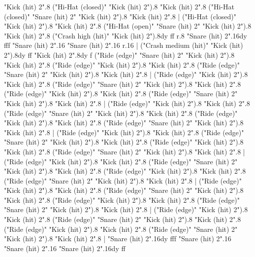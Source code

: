       "Kick (hit) 2".8
      ("Hi-Hat (closed)" "Kick (hit) 2").8
      "Kick (hit) 2".8
      ("Hi-Hat (closed)" "Snare (hit) 2" "Kick (hit) 2").8
      "Kick (hit) 2".8
    |
      ("Hi-Hat (closed)" "Kick (hit) 2").8
      "Kick (hit) 2".8
      ("Hi-Hat (open)" "Snare (hit) 2" "Kick (hit) 2").8
      "Kick (hit) 2".8
      ("Crash high (hit)" "Kick (hit) 2").8{dy ff}
      r.8
      "Snare (hit) 2".16{dy fff}
      "Snare (hit) 2".16
      "Snare (hit) 2".16
      r.16
    |
      ("Crash medium (hit)" "Kick (hit) 2").8{dy ff}
      "Kick (hit) 2".8{dy f}
      ("Ride (edge)" "Snare (hit) 2" "Kick (hit) 2").8
      "Kick (hit) 2".8
      ("Ride (edge)" "Kick (hit) 2").8
      "Kick (hit) 2".8
      ("Ride (edge)" "Snare (hit) 2" "Kick (hit) 2").8
      "Kick (hit) 2".8
    |
      ("Ride (edge)" "Kick (hit) 2").8
      "Kick (hit) 2".8
      ("Ride (edge)" "Snare (hit) 2" "Kick (hit) 2").8
      "Kick (hit) 2".8
      ("Ride (edge)" "Kick (hit) 2").8
      "Kick (hit) 2".8
      ("Ride (edge)" "Snare (hit) 2" "Kick (hit) 2").8
      "Kick (hit) 2".8
    |
      ("Ride (edge)" "Kick (hit) 2").8
      "Kick (hit) 2".8
      ("Ride (edge)" "Snare (hit) 2" "Kick (hit) 2").8
      "Kick (hit) 2".8
      ("Ride (edge)" "Kick (hit) 2").8
      "Kick (hit) 2".8
      ("Ride (edge)" "Snare (hit) 2" "Kick (hit) 2").8
      "Kick (hit) 2".8
    |
      ("Ride (edge)" "Kick (hit) 2").8
      "Kick (hit) 2".8
      ("Ride (edge)" "Snare (hit) 2" "Kick (hit) 2").8
      "Kick (hit) 2".8
      ("Ride (edge)" "Kick (hit) 2").8
      "Kick (hit) 2".8
      ("Ride (edge)" "Snare (hit) 2" "Kick (hit) 2").8
      "Kick (hit) 2".8
    |
      ("Ride (edge)" "Kick (hit) 2").8
      "Kick (hit) 2".8
      ("Ride (edge)" "Snare (hit) 2" "Kick (hit) 2").8
      "Kick (hit) 2".8
      ("Ride (edge)" "Kick (hit) 2").8
      "Kick (hit) 2".8
      ("Ride (edge)" "Snare (hit) 2" "Kick (hit) 2").8
      "Kick (hit) 2".8
    |
      ("Ride (edge)" "Kick (hit) 2").8
      "Kick (hit) 2".8
      ("Ride (edge)" "Snare (hit) 2" "Kick (hit) 2").8
      "Kick (hit) 2".8
      ("Ride (edge)" "Kick (hit) 2").8
      "Kick (hit) 2".8
      ("Ride (edge)" "Snare (hit) 2" "Kick (hit) 2").8
      "Kick (hit) 2".8
    |
      ("Ride (edge)" "Kick (hit) 2").8
      "Kick (hit) 2".8
      ("Ride (edge)" "Snare (hit) 2" "Kick (hit) 2").8
      "Kick (hit) 2".8
      ("Ride (edge)" "Kick (hit) 2").8
      "Kick (hit) 2".8
      ("Ride (edge)" "Snare (hit) 2" "Kick (hit) 2").8
      "Kick (hit) 2".8
    |
      "Snare (hit) 2".16{dy fff}
      "Snare (hit) 2".16
      "Snare (hit) 2".16
      "Snare (hit) 2".16{dy ff}
